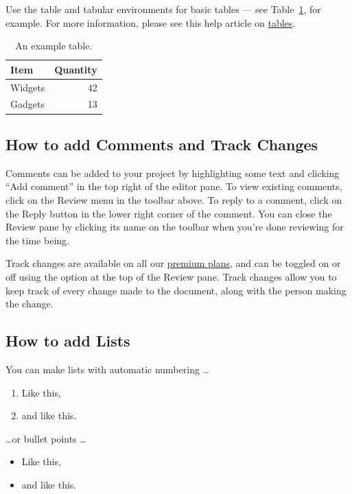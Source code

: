 \documentclass{article}
\begin{document}
Use the table and tabular environments for basic tables --- see Table~\ref{tab:widgets}, for example. For more information, please see this help article on \href{https://www.overleaf.com/learn/latex/tables}{tables}. 

\begin{table}
\centering
\begin{tabular}{l|r}
Item & Quantity \\\hline
Widgets & 42 \\
Gadgets & 13
\end{tabular}
\caption{\label{tab:widgets}An example table.}
\end{table}

\subsection{How to add Comments and Track Changes}

Comments can be added to your project by highlighting some text and clicking ``Add comment'' in the top right of the editor pane. To view existing comments, click on the Review menu in the toolbar above. To reply to a comment, click on the Reply button in the lower right corner of the comment. You can close the Review pane by clicking its name on the toolbar when you're done reviewing for the time being.

Track changes are available on all our \href{https://www.overleaf.com/user/subscription/plans}{premium plans}, and can be toggled on or off using the option at the top of the Review pane. Track changes allow you to keep track of every change made to the document, along with the person making the change. 

\subsection{How to add Lists}

You can make lists with automatic numbering \dots

\begin{enumerate}
\item Like this,
\item and like this.
\end{enumerate}
\dots or bullet points \dots
\begin{itemize}
\item Like this,
\item and like this.
\end{itemize}
\end{document}
